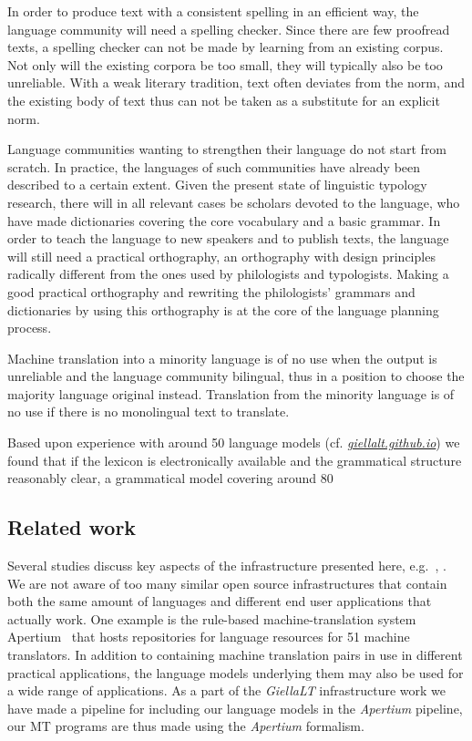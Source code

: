 \documentclass[free]{flammie}
\begin{document}
In order to produce text with a consistent spelling in an efficient way, the
language community will need a spelling checker. Since there are few proofread
texts, a spelling checker can not be made by learning from an existing corpus.
Not only will the existing corpora be too small, they will typically also be too
unreliable. With a weak literary tradition, text often deviates from the norm,
and the existing body of text thus can not be taken as a substitute for an
explicit norm.

Language communities wanting to strengthen their language do not start from
scratch. In practice, the languages of such communities have already been
described to a certain extent. Given the present state of linguistic typology
research, there will in all relevant cases be scholars devoted to the language,
who have made dictionaries covering the core vocabulary and a basic grammar. In
order to teach the language to new speakers and to publish texts, the language
will still need a practical orthography, an orthography with design principles
radically different from the ones used by philologists and typologists. Making a
good practical orthography and rewriting the philologists' grammars and
dictionaries by using this orthography is at the core of the language planning
process.

Machine translation into a minority language is of no use when the output is
unreliable and the language community bilingual, thus in a position to choose
the majority language original instead. Translation from the minority language
is of no use if there is no monolingual text to translate.






Based upon experience with around 50 language models (cf.
\textit{\href{https://giellalt.github.io/LanguageModels.html}{giellalt.github.io}})
we found that if the lexicon is electronically available and the grammatical
structure reasonably clear, a grammatical model covering around 80 \



\subsection{Related work}\label{sec:relwork}


Several studies discuss key aspects of the infrastructure presented here,
e.g.~\cite{pirinen2021building}, \cite{moshagen2013building}.  We are not
aware of too many similar open source infrastructures that contain both the same
amount of languages and different end user applications that actually work. One
example is the rule-based machine-translation system
Apertium~\cite{khanna2021recent} that hosts repositories for language resources
for 51 machine translators. In addition to containing machine translation pairs
in use in different practical applications, the language models underlying them
may also be used for a wide range of applications. As a part of the
\textit{GiellaLT} infrastructure work we have made a pipeline for including our
language models in the \textit{Apertium} pipeline, our MT programs are thus made
using the \textit{Apertium} formalism.
\end{document}
